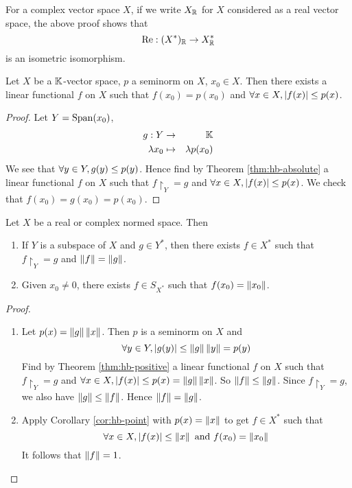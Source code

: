 \documentclass{article}
\begin{document}
\begin{rmk}
  For a complex vector space $X$, if we write $X_\mathbb R$ for $X$ considered as a real vector space, the above proof shows that
  $$\operatorname{Re} : (X^*)_\mathbb R \rightarrow X_\mathbb R^*$$
  is an isometric isomorphism.
\end{rmk}

\begin{ncor}\label{cor:hb-point}
  Let $X$ be a $\mathbb K$-vector space, $p$ a seminorm on $X$, $x_0 \in X$. Then there exists a linear functional $f$ on $X$ such that $f(x_0) = p(x_0)$ and $\forall x \in X, |f(x)| \le p(x)$.
\end{ncor}
\begin{proof}
  Let $Y = \mathrm{Span}(x_0)$,
  \begin{eqnarray*}
    g : Y & \rightarrow & \mathbb K \\
    \lambda x_0 & \mapsto & \lambda p(x_0)
  \end{eqnarray*}
  We see that $\forall y \in Y, g(y) \le p(y)$. Hence find by Theorem \ref{thm:hb-absolute} a linear functional $f$ on $X$ such that $f\restriction_Y = g$ and $\forall x \in X, |f(x)| \le p(x)$. We check that $f(x_0) = g(x_0) = p(x_0)$.
\end{proof}

\begin{nthm}\label{thm:hb-support}
  Let $X$ be a real or complex normed space. Then
  \begin{enumerate}
    \item If $Y$ is a subspace of $X$ and $g \in Y^*$, then there exists $f \in X^*$ such that $f\restriction_Y = g$ and $\left\lVert f\right\rVert = \left\lVert g\right\rVert$.
    \item Given $x_0 \ne 0$, there exists $f \in S_{X^*}$ such that $f(x_0) = \left\lVert x_0\right\rVert$.
  \end{enumerate}
\end{nthm}
\begin{proof}~
  \begin{enumerate}
    \item Let $p(x) = \left\lVert g\right\rVert \left\lVert x\right\rVert$. Then $p$ is a seminorm on $X$ and
      $$\forall y \in Y, |g(y)| \le \left\lVert g\right\rVert \left\lVert y\right\rVert = p(y)$$
      Find by Theorem \ref{thm:hb-positive} a linear functional $f$ on $X$ such that $f\restriction_Y = g$ and $\forall x \in X, |f(x)| \le p(x) = \left\lVert g\right\rVert \left\lVert x\right\rVert$. So $\left\lVert f\right\rVert \le \left\lVert g\right\rVert$. Since $f\restriction_Y = g$, we also have $\left\lVert g\right\rVert \le \left\lVert f\right\rVert$. Hence $\left\lVert f\right\rVert = \left\lVert g\right\rVert$.
    \item Apply Corollary \ref{cor:hb-point} with $p(x) = \left\lVert x\right\rVert$ to get $f \in X^*$ such that
      $$\forall x \in X, |f(x)| \le \left\lVert x\right\rVert \text{ and } f(x_0) = \left\lVert x_0\right\rVert$$
      It follows that $\left\lVert f\right\rVert = 1$.
  \end{enumerate}
\end{proof}
\end{document}
